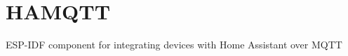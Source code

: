 \chapter{HAMQTT }
\hypertarget{md__r_e_a_d_m_e}{}\label{md__r_e_a_d_m_e}
\label{md__r_e_a_d_m_e_autotoc_md0}%
%


ESP-\/\+IDF component for integrating devices with Home Assistant over MQTT 